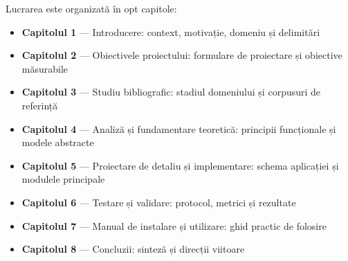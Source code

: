 Lucrarea este organizată în opt capitole:

\begin{itemize}
  \item \textbf{Capitolul 1} — Introducere: context, motivație, domeniu și delimitări
  \item \textbf{Capitolul 2} — Obiectivele proiectului: formulare de proiectare și obiective măsurabile
  \item \textbf{Capitolul 3} — Studiu bibliografic: stadiul domeniului și corpusuri de referință
  \item \textbf{Capitolul 4} — Analiză și fundamentare teoretică: principii funcționale și modele abstracte
  \item \textbf{Capitolul 5} — Proiectare de detaliu și implementare: schema aplicației și modulele principale
  \item \textbf{Capitolul 6} — Testare și validare: protocol, metrici și rezultate
  \item \textbf{Capitolul 7} — Manual de instalare și utilizare: ghid practic de folosire
  \item \textbf{Capitolul 8} — Concluzii: sinteză și direcții viitoare
\end{itemize}
